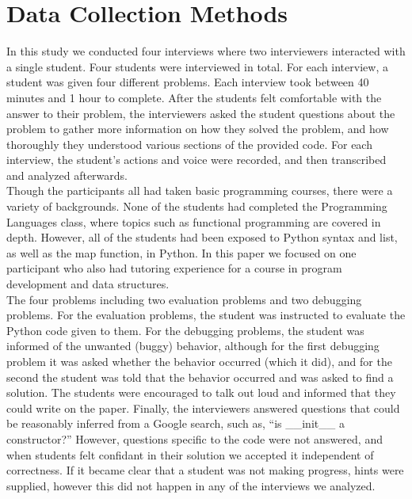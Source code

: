 \section{Data Collection Methods}


In this study we conducted four interviews where two interviewers interacted with a single student. Four students were interviewed in total.
For each interview, a student was given four different problems. Each interview took between 40 minutes and 1 hour to complete.
After the students felt comfortable with the answer to their problem,
 the interviewers asked the student questions about the problem to gather more information on how they solved the problem,
 and how thoroughly they understood various sections of the provided code.
For each interview, the student's actions and voice were recorded, and then transcribed and analyzed afterwards. \\

Though the participants all had taken basic programming courses, there were a variety of backgrounds.
None of the students had completed the Programming Languages class, where topics such as functional programming are covered in depth.
However, all of the students had been exposed to Python syntax and list, as well as the map function, in Python.
In this paper we focused on one participant who also had tutoring experience for a course in program development and data structures. \\

The four problems including two evaluation problems and two debugging problems.
For the evaluation problems, the student was instructed to evaluate the Python code given to them.
For the debugging problems, the student was informed of the unwanted (buggy) behavior,
 although for the first debugging problem it was asked whether the behavior occurred (which it did),
 and for the second the student was told that the behavior occurred and was asked to find a solution.
The students were encouraged to talk out loud and informed that they could write on the paper.
Finally, the interviewers answered questions that could be reasonably inferred from a Google search, such as,
``is \_\_init\_\_ a constructor?''
However, questions specific to the code were not answered, and when students felt confidant in their solution we accepted it independent of correctness.
If it became clear that a student was not making progress, hints were supplied, however this did not happen in any of the interviews we analyzed.


